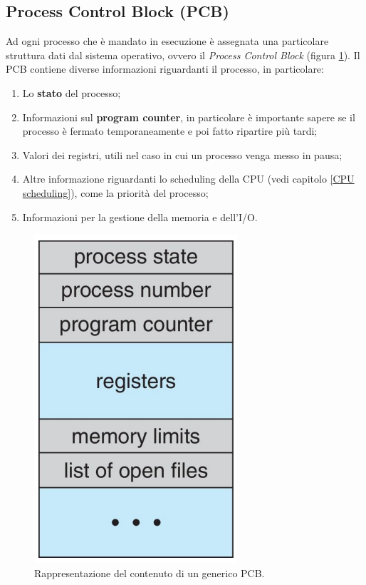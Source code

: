 % 
\subsection{Process Control Block (PCB)}\label{PCB}
Ad ogni processo che è mandato in esecuzione è assegnata una particolare struttura dati dal sistema operativo, ovvero il \textit{Process Control Block} (figura \ref{fig:PCB}). Il PCB contiene diverse informazioni riguardanti il processo, in particolare:
\vspace{-5px}
\begin{enumerate}
\setlength{\itemsep}{-.15 em}
    \item Lo \textbf{stato} del processo;
    \item Informazioni sul \textbf{program counter}, in particolare è importante sapere se il processo è fermato temporaneamente e poi fatto ripartire più tardi;
    \item Valori dei registri, utili nel caso in cui un processo venga messo in pausa;
    \item Altre informazione riguardanti lo scheduling della CPU (vedi capitolo \ref{CPU scheduling}), come la priorità del processo;
    \item Informazioni per la gestione della memoria e dell'I/O.
\end{enumerate}
\begin{figure}[h]
    \centering
    \includegraphics[width = .20\textwidth]{../res/imgs/processes/PCB.png}
    \caption{Rappresentazione del contenuto di un generico PCB.}
    \label{fig:PCB}
\end{figure}

